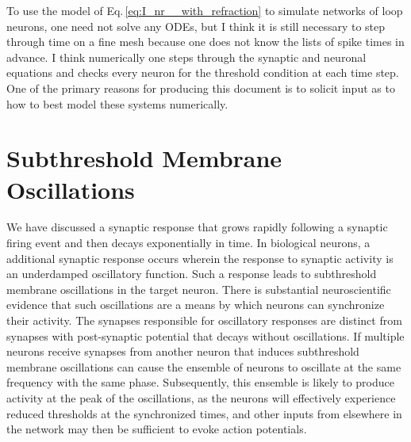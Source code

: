 \documentclass[]{article}
\begin{document}
To use the model of Eq.\,\ref{eq:I_nr__with_refraction} to simulate networks of loop neurons, one need not solve any ODEs, but I think it is still necessary to step through time on a fine mesh because one does not know the lists of spike times in advance. I think numerically one steps through the synaptic and neuronal equations and checks every neuron for the threshold condition at each time step. One of the primary reasons for producing this document is to solicit input as to how to best model these systems numerically.

\section{\label{sec:subthreshold_oscillations}Subthreshold Membrane Oscillations}
We have discussed a synaptic response that grows rapidly following a synaptic firing event and then decays exponentially in time. In biological neurons, a additional synaptic response occurs wherein the response to synaptic activity is an underdamped oscillatory function. Such a response leads to subthreshold membrane oscillations in the target neuron. There is substantial neuroscientific evidence that such oscillations are a means by which neurons can synchronize their activity. The synapses responsible for oscillatory responses are distinct from synapses with post-synaptic potential that decays without oscillations. If multiple neurons receive synapses from another neuron that induces subthreshold membrane oscillations can cause the ensemble of neurons to oscillate at the same frequency with the same phase. Subsequently, this ensemble is likely to produce activity at the peak of the oscillations, as the neurons will effectively experience reduced thresholds at the synchronized times, and other inputs from elsewhere in the network may then be sufficient to evoke action potentials.
\end{document}
